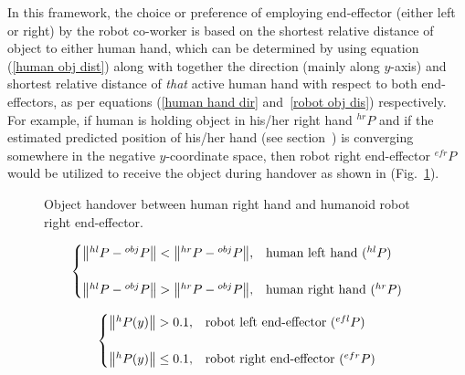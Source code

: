 In this framework, the choice or preference of employing end-effector (either left or right) by the robot co-worker is based on the shortest relative distance of object to either human hand, which can be determined by using equation (\ref{human obj dist}) along with together the direction (mainly along $y$-axis) and shortest relative distance of \textit{that} active human hand with respect to both end-effectors, as per equations (\ref{human hand dir} and~\ref{robot obj dis}) respectively. For example, if human is holding object in his/her right hand ${}^{hr}{P}$ and if the estimated predicted position of his/her hand (see section~) is converging somewhere in the negative $y$-coordinate space, then robot right end-effector ${}^{efr}{P}$ would be utilized to receive the object during handover as shown in (Fig.~\ref{fig:hr-to-rr}).


\begin{figure}[hpt]
	\caption{Object handover between human right hand and humanoid robot right end-effector.}
	\label{fig:hr-to-rr}
\end{figure}


\begin{equation}\label{human obj dist}
\centering
\begin{cases}
	\norm{{}^{hl}{P} - {}^{obj}{P}} < \norm{{}^{hr}{P} - {}^{obj}{P}}, & \text{human left hand (${}^{hl}{P}$)}  \\
	\\
	\norm{{}^{hl}{P} - {}^{obj}{P}} > \norm{{}^{hr}{P} - {}^{obj}{P}}, & \text{human right hand (${}^{hr}{P}$)}
\end{cases}         
\end{equation}


\begin{equation}\label{human hand dir}
\centering
\begin{cases}
\norm{{}^{h}{P}(y)} > 0.1,  &  \text{robot left end-effector (${}^{efl}{P}$)} \\
\\
\norm{{}^{h}{P}(y)} \leq 0.1,  &  \text{robot right end-effector (${}^{efr}{P}$)}
\end{cases}         
\end{equation}

